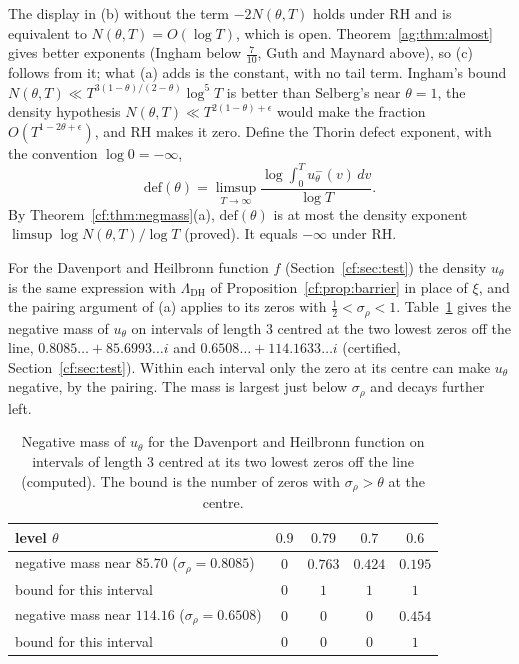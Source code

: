 The display in (b) without the term $-2N(\theta,T)$ holds under RH and is equivalent to $N(\theta,T)=O(\log T)$, which is open. Theorem~\ref{ag:thm:almost} gives better exponents (Ingham below $\frac7{10}$, Guth and Maynard above), so (c) follows from it; what (a) adds is the constant, with no tail term. Ingham's bound $N(\theta,T)\ll T^{3(1-\theta)/(2-\theta)}\log^5T$ is better than Selberg's near $\theta=1$, the density hypothesis $N(\theta,T)\ll T^{2(1-\theta)+\epsilon}$ would make the fraction $O(T^{1-2\theta+\epsilon})$, and RH makes it zero. Define the Thorin defect exponent, with the convention $\log0=-\infty$,
\[
\mathrm{def}(\theta)=\limsup_{T\to\infty}\frac{\log\int_0^Tu_\theta^-(v)\,dv}{\log T}.
\]
By Theorem~\ref{cf:thm:negmass}(a), $\mathrm{def}(\theta)$ is at most the density exponent $\limsup\log N(\theta,T)/\allowbreak\log T$ (proved). It equals $-\infty$ under RH.

For the Davenport and Heilbronn function $f$ (Section~\ref{cf:sec:test}) the density $u_\theta$ is the same expression with $\Lambda_{\mathrm{DH}}$ of Proposition~\ref{cf:prop:barrier} in place of $\xi$, and the pairing argument of (a) applies to its zeros with $\frac12<\sigma_\rho<1$. Table~\ref{cf:tab:negmass} gives the negative mass of $u_\theta$ on intervals of length $3$ centred at the two lowest zeros off the line, $0.8085\ldots+85.6993\ldots i$ and $0.6508\ldots+114.1633\ldots i$ (certified, Section~\ref{cf:sec:test}). Within each interval only the zero at its centre can make $u_\theta$ negative, by the pairing. The mass is largest just below $\sigma_\rho$ and decays further left.

\begin{table}[h]
\centering
\begin{tabular}{lcccc}
\toprule
level $\theta$ & $0.9$ & $0.79$ & $0.7$ & $0.6$\\
\midrule
negative mass near $85.70$ ($\sigma_\rho=0.8085$) & $0$ & $0.763$ & $0.424$ & $0.195$\\
bound for this interval & $0$ & $1$ & $1$ & $1$\\
negative mass near $114.16$ ($\sigma_\rho=0.6508$) & $0$ & $0$ & $0$ & $0.454$\\
bound for this interval & $0$ & $0$ & $0$ & $1$\\
\bottomrule
\end{tabular}
\caption{Negative mass of $u_\theta$ for the Davenport and Heilbronn function on intervals of length $3$ centred at its two lowest zeros off the line (computed). The bound is the number of zeros with $\sigma_\rho>\theta$ at the centre.}
\label{cf:tab:negmass}
\end{table}

